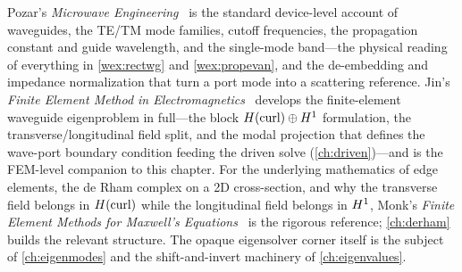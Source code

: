 \furtherreading
Pozar's \emph{Microwave Engineering}~\citep{pozar2011} is the standard
device-level account of waveguides, the TE/TM mode families, cutoff frequencies,
the propagation constant and guide wavelength, and the single-mode band---the
physical reading of everything in \cref{wex:rectwg} and \cref{wex:propevan}, and the
de-embedding and impedance normalization that turn a port mode into a scattering
reference. Jin's \emph{Finite Element Method in
Electromagnetics}~\citep{jin2014} develops the finite-element waveguide
eigenproblem in full---the block $H(\mathrm{curl})\oplus H^1$ formulation, the
transverse/longitudinal field split, and the modal projection that defines the
wave-port boundary condition feeding the driven solve (\cref{ch:driven})---and is
the FEM-level companion to this chapter. For the underlying mathematics of edge
elements, the de Rham complex on a 2D cross-section, and why the transverse field
belongs in $H(\mathrm{curl})$ while the longitudinal field belongs in $H^1$, Monk's
\emph{Finite Element Methods for Maxwell's Equations}~\citep{monk2003} is the
rigorous reference; \cref{ch:derham} builds the relevant structure. The opaque
eigensolver corner itself is the subject of \cref{ch:eigenmodes} and the
shift-and-invert machinery of \cref{ch:eigenvalues}.

